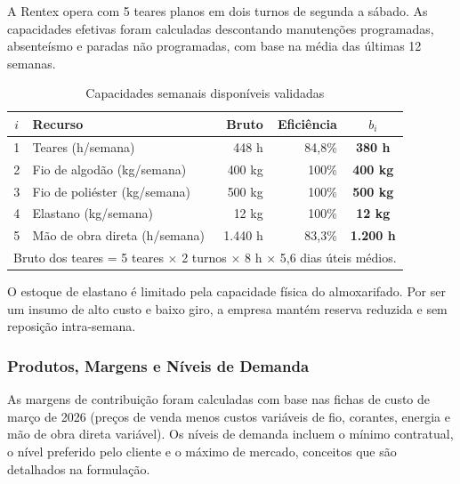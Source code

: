 A Rentex opera com 5 teares planos em dois turnos de segunda a sábado. As
capacidades efetivas foram calculadas descontando manutenções programadas,
absenteísmo e paradas não programadas, com base na média das últimas 12 semanas.

\begin{table}[H]
\centering
\caption{Capacidades semanais disponíveis validadas}
\label{tab:cap_r2}
\begin{tabular}{clrrc}
\toprule
\textbf{$i$} & \textbf{Recurso} & \textbf{Bruto} & \textbf{Eficiência} & \textbf{$b_i$} \\
\midrule
1 & Teares (h/semana)              & 448 h   & 84,8\% & \textbf{380 h}   \\
2 & Fio de algodão (kg/semana)     & 400 kg  & 100\%  & \textbf{400 kg}  \\
3 & Fio de poliéster (kg/semana)   & 500 kg  & 100\%  & \textbf{500 kg}  \\
4 & Elastano (kg/semana)           &  12 kg  & 100\%  & \textbf{12 kg}   \\
5 & Mão de obra direta (h/semana)  & 1.440 h & 83,3\% & \textbf{1.200 h} \\
\bottomrule
\multicolumn{5}{l}{\footnotesize Bruto dos teares = 5 teares $\times$ 2 turnos $\times$ 8 h $\times$ 5,6 dias úteis médios.}
\end{tabular}
\end{table}

O estoque de elastano é limitado pela capacidade física do almoxarifado. Por ser
um insumo de alto custo e baixo giro, a empresa mantém reserva reduzida e sem
reposição intra-semana.

\subsubsection{Produtos, Margens e Níveis de Demanda}

As margens de contribuição foram calculadas com base nas fichas de custo de
março de 2026 (preços de venda menos custos variáveis de fio, corantes, energia
e mão de obra direta variável). Os níveis de demanda incluem o mínimo contratual,
o nível preferido pelo cliente e o máximo de mercado, conceitos que são
detalhados na formulação.

